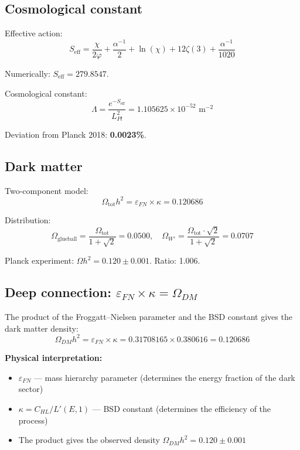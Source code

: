 \documentclass[12pt,a4paper,twoside]{article}
\newcommand{\EPS}{\varepsilon}
\theoremstyle{definition}
\begin{document}
\subsection{Cosmological constant}

Effective action:
\begin{equation}
S_{\text{eff}} = \frac{\chi}{2\varphi} + \frac{\alpha^{-1}}{2} + \ln(\chi) + 12\zeta(3) + \frac{\alpha^{-1}}{1020}
\label{eq:seff}
\end{equation}

Numerically: $S_{\text{eff}} = 279.8547$.

Cosmological constant:
\begin{equation}
\Lambda = \frac{e^{-S_{\text{eff}}}}{L_{Pl}^2} = 1.105625 \times 10^{-52} \text{ m}^{-2}
\label{eq:lambda}
\end{equation}

Deviation from Planck 2018: \textbf{0.0023\%}.

\subsection{Dark matter}

Two-component model:
\begin{equation}
\Omega_{\text{tot}} h^2 = \EPS_{FN} \times \kappa = 0.120686
\label{eq:dm}
\end{equation}

Distribution:
\begin{equation}
\Omega_{\text{glueball}} = \frac{\Omega_{\text{tot}}}{1 + \sqrt{2}} = 0.0500, \quad
\Omega_{W'} = \frac{\Omega_{\text{tot}} \cdot \sqrt{2}}{1 + \sqrt{2}} = 0.0707
\label{eq:dm_split}
\end{equation}

Planck experiment: $\Omega h^2 = 0.120 \pm 0.001$. Ratio: 1.006.

\subsection{Deep connection: $\EPS_{FN} \times \kappa = \Omega_{DM}$}
\label{sec:deep_connection}

The product of the Froggatt--Nielsen parameter and the BSD constant gives the dark matter density:
\begin{equation}
\Omega_{DM} h^2 = \EPS_{FN} \times \kappa = 0.31708165 \times 0.380616 = 0.120686
\label{eq:deep_connection2}
\end{equation}

\textbf{Physical interpretation:}
\begin{itemize}
    \item $\EPS_{FN}$ — mass hierarchy parameter (determines the energy fraction of the dark sector)
    \item $\kappa = C_{HL}/L'(E,1)$ — BSD constant (determines the efficiency of the process)
    \item The product gives the observed density $\Omega_{DM} h^2 = 0.120 \pm 0.001$
\end{itemize}
\end{document}
